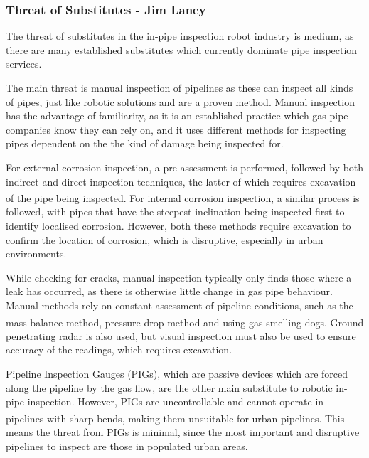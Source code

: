 \documentclass[11pt]{article}		%
\newcommand{\supercite}[1]{\textsuperscript{\cite{#1}}}		%
\begin{document}
	       \subsubsection{Threat of Substitutes - Jim Laney}
				
				The threat of substitutes in the in-pipe inspection robot industry is medium, as there are many established substitutes which currently dominate pipe inspection services.
				
				The main threat is manual inspection of pipelines as these can inspect all kinds of pipes, just like robotic solutions and are a proven method.
				Manual inspection has the advantage of familiarity, as it is an established practice which gas pipe companies know they can rely on, and it uses different methods for inspecting pipes dependent on the the kind of damage being inspected for.
				
				For external corrosion inspection, a pre-assessment is performed, followed by both indirect and direct inspection techniques, the latter of which requires excavation of the pipe being inspected\supercite{kishawy2010review}. 
				For internal corrosion inspection, a similar process is followed, with pipes that have the steepest inclination being inspected first to identify localised corrosion. 
				However, both these methods require excavation to confirm the location of corrosion, which is disruptive, especially in urban environments.
				
				While checking for cracks, manual inspection typically only finds those where a leak has occurred, as there is otherwise little change in gas pipe behaviour.
				Manual methods rely on constant assessment of pipeline conditions, such as the mass-balance method, pressure-drop method and using gas smelling dogs\supercite{kishawy2010review}.
				Ground penetrating radar is also used, but visual inspection must also be used to ensure accuracy of the readings, which requires excavation.
				
				Pipeline Inspection Gauges (PIGs), which are passive devices which are forced along the pipeline by the gas flow, are the other main substitute to robotic in-pipe inspection.
				However, PIGs are uncontrollable and cannot operate in pipelines with sharp bends\supercite{mills2017advances}, making them unsuitable for urban pipelines.
				This means the threat from PIGs is minimal, since the most important and disruptive pipelines to inspect are those in populated urban areas.
				
\end{document}
